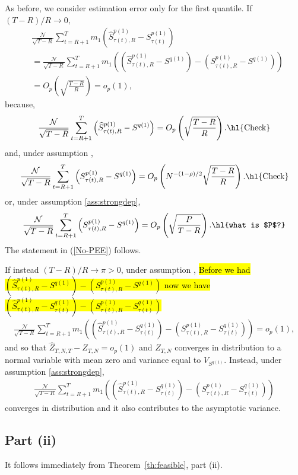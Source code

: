 As before, we consider estimation error only for the first quantile. If $(T-R)/R\rightarrow 0,$
\begin{align*}
&\frac{\mathcal{N}}{\sqrt{T-R}}\sum_{t=R+1}^{T}m_{1}\left( \widehat{S}_{\tau(t),R}^{p(1)}-S_{\tau(t)}^{p(1)}\right) \\
&=\frac{\mathcal{N}}{\sqrt{T-R}}\sum_{t=R+1}^{T}m_{1}\left( \left( \widehat{S}_{\tau(t),R}^{p(1)}-S^{q(1)} \right) - \left( S_{\tau(t),R}^{p(1)}-S^{q(1)} \right) \right) \\
&=O_{p}\left( \sqrt{\frac{T-R}{R}}\right) =o_{p}(1),
\end{align*}
because,
\begin{align*}
\frac{\mathcal{N}}{\sqrt{T-R}}\sum_{t=R+1}^{T}\left( \widehat{S}_{\tau(t),R}^{p(1)}-S^{q(1)}\right)
=O_{p}\left( \sqrt{\frac{T-R}{R}}\right). \text{\hl{Check}}
\end{align*}
and, under assumption ,
\begin{align*}
\frac{\mathcal{N}}{\sqrt{T-R}}\sum_{t=R+1}^{T}\left( S_{\tau(t),R}^{p(1)}-S^{q(1)}\right)
=O_{p}\left( N^{-(1-\rho)/2} \sqrt{\frac{T-R}{R}}\right). \text{\hl{Check}}
\end{align*}
or, under assumption \ref{ass:strongdep},
\begin{align*}
\frac{\mathcal{N}}{\sqrt{T-R}}\sum_{t=R+1}^{T}\left( S_{\tau(t),R}^{p(1)}-S^{q(1)}\right)
=O_{p}\left( \sqrt{\frac{P}{T-R}}\right). \text{\hl{what is $P$?}}
\end{align*}
The statement in (\ref{No-PEE}) follows.

If instead $(T-R)/R\rightarrow \pi >0$, under assumption , \hl{Before we had $(\widehat{S}_{\tau(t),R}^{p(1)}-S^{q(1)}) - ( S_{\tau(t),R}^{p(1)}-S^{q(1)})$ now we have $(\widehat{S}_{\tau(t),R}^{p(1)}-S^{q(1)}_{\tau(t)} ) - ( S_{\tau(t),R}^{p(1)}-S^{q(1)}_{\tau(t)})$}
\begin{align*}
\frac{\mathcal{N}}{\sqrt{T-R}}\sum_{t=R+1}^{T}m_{1}\left( \left( \widehat{S}_{\tau(t),R}^{p(1)}-S^{q(1)}_{\tau(t)} \right) - \left( S_{\tau(t),R}^{p(1)}-S^{q(1)}_{\tau(t)} \right) \right) =o_{p}(1),
\end{align*}
and so that $\widehat{Z}_{T,N,T}-Z_{T,N}=o_p(1)$ and $Z_{T,N}$
converges in distribution to a normal variable with mean zero and variance equal to $V_{S^{q(1)}}$. Instead, under assumption \ref{ass:strongdep},
\begin{align*}
\frac{\mathcal{N}}{\sqrt{T-R}}\sum_{t=R+1}^{T}m_{1}\left( \left( \widehat{S}_{\tau(t),R}^{p(1)}-S^{q(1)}_{\tau(t)} \right) - \left( S_{\tau(t),R}^{p(1)}-S^{q(1)}_{\tau(t)} \right) \right)
\end{align*}
converges in distribution and it also contributes to the asymptotic variance.

\subsection{Part (ii)}

It follows immediately from Theorem~\ref{th:feasible}, part (ii).